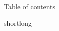 


 \begin{frame}{Table of contents}
   \tableofcontents
 \end{frame}
 
\begin{frame}{short}{long}
	\centering
	
		
\end{frame}
